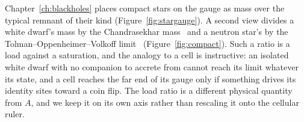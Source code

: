 Chapter~\ref{ch:blackholes} places compact stars on the gauge as mass over the typical remnant of their kind
(Figure~\ref{fig:stargauge}). A second view divides a white dwarf's mass by the Chandrasekhar mass~\cite{Chandrasekhar1931} and a
neutron star's by the Tolman--Oppenheimer--Volkoff limit~\cite{Tolman1939,OppenheimerVolkoff1939} (Figure~\ref{fig:compact}). Such a
ratio is a load against a saturation, and the analogy to a cell is instructive: an isolated white dwarf with no companion to accrete
from cannot reach its limit whatever its state, and a cell reaches the far end of its gauge only if something drives its identity
sites toward a coin flip. \analogy{} The load ratio is a different physical quantity from $A$, and we keep it on its own axis rather
than rescaling it onto the cellular ruler.


